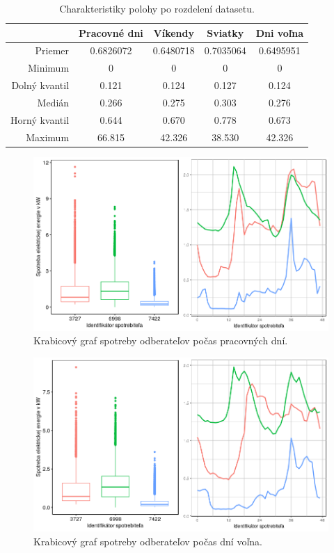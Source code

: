 \documentclass[a4paper,twoside,slovak,12pt,appendix]{article}
\begin{document}
\begin{table}[ht]
  \centering
  \caption{Charakteristiky polohy po rozdelení datasetu.}
  \label{tab:dataset-statistics}
  \begin{tabular}{|r|c|c|c|c|}
    \hline
					&  \textbf{Pracovné dni}  &	\textbf{Víkendy}	&	\textbf{Sviatky}	&	\textbf{Dni voľna} 	\\ \hline
		Priemer				&		0.6826072			&		0.6480718				&		0.7035064				&		0.6495951				 	\\ \hline
		Minimum				&		0							&		0								&		0								&		0								 	\\ \hline
		Dolný kvantil	&		0.121					&		0.124						&		0.127						&		0.124							\\ \hline
		Medián				&		0.266					&		0.275						&		0.303						&		0.276							\\ \hline
		Horný kvantil	&		0.644					&		0.670						&		0.778						&		0.673							\\ \hline
		Maximum				&		66.815				&		42.326					&		38.530					&		42.326						\\ \hline
  \end{tabular}
\end{table}

\begin{figure}[htbp]
  \centering
  \includegraphics[width=\textwidth]{workdays_plot.png}
  \caption{Krabicový graf spotreby odberateľov počas pracovných dní.}
  \label{fig:workdays-plot}
\end{figure}

\begin{figure}[htbp]
  \centering
  \includegraphics[width=\textwidth]{holidays_plot.png}
  \caption{Krabicový graf spotreby odberateľov počas dní voľna.}
  \label{fig:holidays-plot}
\end{figure}
\end{document}
